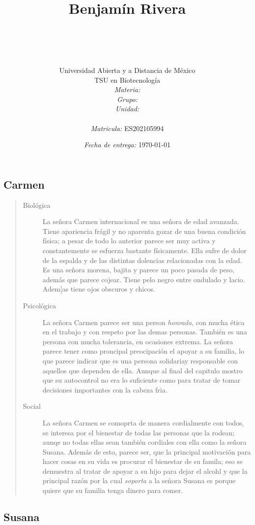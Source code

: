 \documentclass[12pt]{article}
\title{
	\ \\\ \\\
	\ \\ Benjam\'in Rivera \\
	\bf{\titulo}\\\ \\}
\author{
	{\Huge Universidad Abierta y a Distancia de México} \\
	TSU en Biotecnolog\'ia \\
	\textit{Materia:} \materia \\
	\textit{Grupo:} \grupo \\
	\textit{Unidad:} \unidad \\
	\\
	\textit{Matricula:} ES202105994 }
\date{\textit{Fecha de entrega:} \today}
\begin{document}
\maketitle\newpage

\subsection*{Carmen}
	
	\begin{quote}\begin{description} 
		\item [Biol\'ogica] La se\~nora Carmen internacional  es una se\~nora de edad avanzada. Tiene apariencia  fr\'agil y no aparenta gozar  de una buena condici\'on física; a pesar de todo lo anterior parece ser muy activa y constantemente se esfuerza bastante f\'isicamente. Ella sufre de dolor de la espalda y de las distintas dolencias relacionadas con la edad. Es una se\~nora morena, bajita y parece un poco pasada de peso, adem\'as que parece cojear. Tiene pelo negro entre ondulado y lacio. Adem[as tiene ojos obscuros y chicos.
		\item [Psicol\'ogica] La se\~nora Carmen parece ser una person \textit{honrada}, con mucha \'etica en el trabajo y con respeto por las demas personas. Tambi\'en es una persona con mucha tolerancia, en ocasiones extrema. La se\~nora parece tener como proncipal preocipaci\'on el apoyar a su familia, lo que parece indicar que es una persona solidariay responsable con aquellos que dependen de ella. Aunque al final del capitulo mostro que su autocontrol no era lo suficiente como para tratar de tomar decisiones importantes con la cabeza fria.
		\item [Social] La se\~nora Carmen se comoprta de manera cordialmente con todos, se interesa por el bienestar de todas las personas que la rodean; aunqe no todas ellas sean también cordiales con ella como la se\~nora Susana. Adem\'as de esto, parece ser, que la principal motivaci\'on para hacer cosas en su vida es procurar el bienestar de su famila; eso se demuestra al tratar de apoyar a su hijo para dejar el alcohl y que la principal raz\'on por la cual \textit{soporta} a la se\`nora Susana es porque quiere que su familia tenga dinero para comer.
	\end{description}\end{quote}


\subsection*{Susana}
	
\end{document}
